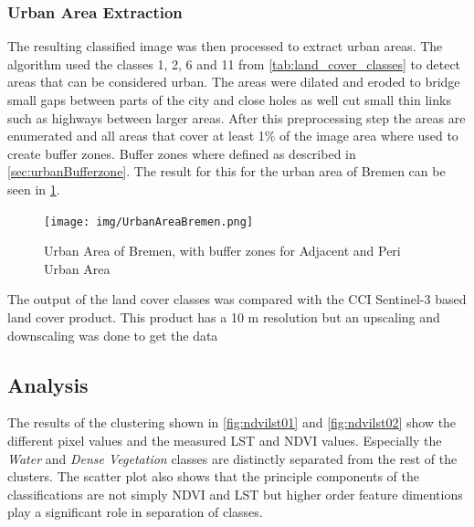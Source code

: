 \documentclass[12pt,a4paper, english,twoside]{scrartcl}
\begin{document}
    \subsubsection{Urban Area Extraction}\label{sec:urbanAreaExtraction}
      The resulting classified image was then processed to extract urban areas.
      The algorithm used the classes 1, 2, 6 and 11 from \cref{tab:land_cover_classes} to detect areas that can be considered urban.
      The areas were \gls{dilated} and \gls{eroded} to bridge small gaps between parts of the city and close holes as well cut small thin links such as highways between larger areas.
      After this preprocessing step the areas are enumerated and all areas that cover at least 1\% of the image area where used to create buffer zones. 
      Buffer zones where defined as described in \cref{sec:urbanBufferzone}. 
      The result for this for the urban area of Bremen can be seen in \cref{fig:bufferedBremen}.\\
      \begin{figure}
        \texttt{[image: img/UrbanAreaBremen.png]}
        \caption{Urban Area of Bremen, with buffer zones for Adjacent and Peri Urban Area\label{fig:bufferedBremen}}
      \end{figure}
      The output of the land cover classes was compared with the CCI Sentinel-3 based land cover product. 
      This product has a 10 m resolution but an upscaling and downscaling was done to get the data 
    \subsection{Analysis}\label{sec:landcoverAnalysis} 
      The results of the clustering shown in \cref{fig:ndvilst01} and \cref{fig:ndvilst02} show the different pixel values and the measured LST and NDVI values. 
      Especially the \textit{Water} and \textit{Dense Vegetation} classes are distinctly separated from the rest of the clusters. 
      The scatter plot also shows that the principle components of the classifications are not simply NDVI and LST but higher order feature dimentions play a significant role in separation of classes. 
   
\end{document}
